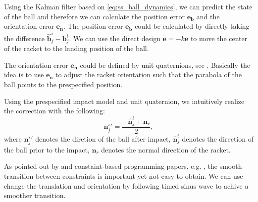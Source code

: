 \documentclass[letterpaper, 10 pt, conference]{ieeeconf}  %
\newcommand{\bs}{\boldsymbol}
\begin{document}
Using the  Kalman filter based on \eqref{eq:ss_ball_dynamics}, we can predict the state of the ball and therefore we can calculate the position error $\bs{e_{\bs{b}}}$  and the orientation error $\bs{e_{\bs{n}}}$. The position error $\bs{e_{\bs{b}}}$ could be calculated by directly taking the difference $\hat{\bs{b}}^{i}_j - \bs{b}^{i}_j$. We can use the direct design $\dot{\bs{e}} = -k \bs{e}$  to move the center of the racket to the landing position of the ball. 

The orientation error
 $\bs{e_{\bs{n}}}$ could be defined by unit quaternions, see \cite{yuquan2015}. Basically the idea is to use $\bs{e_{\bs{n}}}$ to adjust the racket orientation such that the parabola of the ball points to the prespecified position.

Using the prespecified impact model and unit quaternion, we intuitively realize the correction with the following: 
\begin{equation}
{\bs{n}^{i}_j}'  =
 \frac{-\hat{\bs{n}}^{i}_j + \bs{n}_r  }{2},
\end{equation}
where ${\bs{n}^{i}_j}'$ denotes the diretion of the ball after impact,
$\hat{\bs{n}}^{i}_j $ denotes the direction of the ball prior to the impact, $\bs{n}_r$ denotes the normal direction of the racket. 

As pointed out by \cite{post2000principal} and constaint-based programming papers, e.g. \cite{mansard2009unified}, the smooth transition between constraints is important yet not easy to obtain. We can use change the translation and orientation by following timed sinus wave to achive a smoother transition. 


\end{document}
